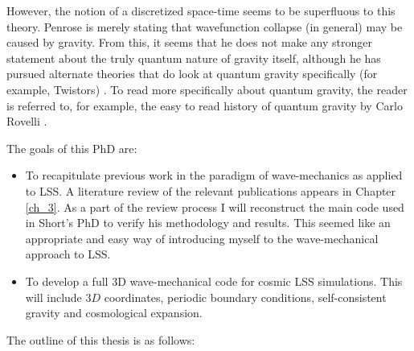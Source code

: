 However, the notion of a discretized space-time seems to be superfluous to this theory. Penrose is merely stating that wavefunction collapse (in general) may be caused by gravity. From this, it seems that he does not make any stronger statement about the truly quantum nature of gravity itself, although he has pursued alternate theories that do look at quantum gravity specifically (for example, Twistors) \citep{bib_pen2}. To read more specifically about quantum gravity, the reader is referred to, for example, the easy to read history of quantum gravity by Carlo Rovelli \citep{bib_rov}.


The goals of this PhD are:
\begin{itemize}
\item To recapitulate previous work in the paradigm of wave-mechanics as applied to LSS. A literature review of the relevant publications appears in Chapter \ref{ch_3}. As a part of the review process I will reconstruct the main code used in Short's PhD \citep{bib_short} to verify his methodology and results. This seemed like an appropriate and easy way of introducing myself to the wave-mechanical approach to LSS.
\item To develop a full 3D wave-mechanical code for cosmic LSS simulations. This will include $3D$ coordinates, periodic boundary conditions, self-consistent gravity and cosmological expansion.
\end{itemize}

The outline of this thesis is as follows:

